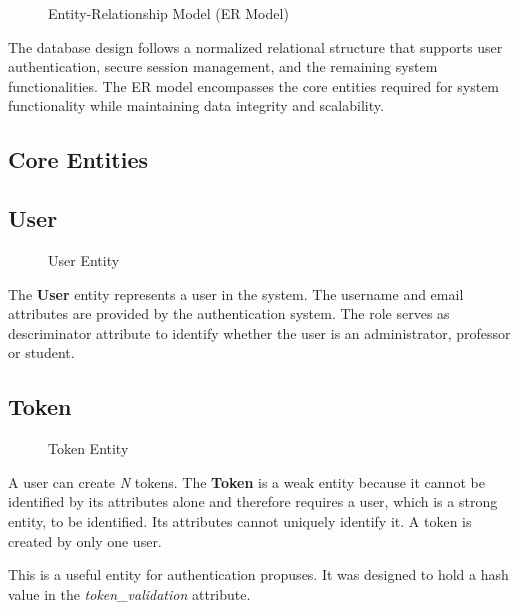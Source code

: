 \begin{figure}[H]
    \centering
    
    \caption{Entity-Relationship Model (ER Model)}
    \label{fig:er_model}
\end{figure}

The database design follows a normalized relational structure that supports user authentication, secure session management, and the remaining system functionalities. The ER model encompasses the core entities required for system functionality while maintaining data integrity and scalability.

\subsection*{Core Entities}
\subsection*{User}

\begin{figure}[H]
    \centering
    
    \caption{User Entity}
    \label{fig:user_entity}
\end{figure}

The \textbf{User} entity represents a user in the system. The username and email attributes are provided by the authentication system. The role serves as descriminator attribute to identify whether the user is an administrator, professor or student.

\subsection*{Token}

\begin{figure}[H]
    \centering
    
    \caption{Token Entity}
    \label{fig:token_entity}
\end{figure}

A user can create \textit{N} tokens. The \textbf{Token} is a weak entity because it cannot be identified by its attributes alone and therefore requires a user, which is a strong entity, to be identified. Its attributes cannot uniquely identify it. A token is created by only one user.

This is a useful entity for authentication propuses. It was designed to hold a hash value in the \textit{token\_validation} attribute.

